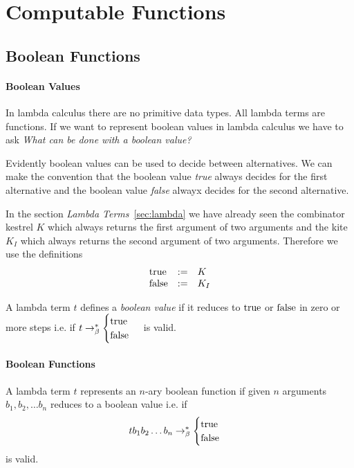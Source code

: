 \section{Computable Functions}


\subsection {Boolean Functions}

\paragraph{Boolean Values}

In lambda calculus there are no primitive data types. All lambda terms are
functions. If we want to represent boolean values in lambda calculus we have
to ask \emph{What can be done with a boolean value?}

Evidently boolean values can be used to decide between alternatives. We can
make the convention that the boolean value \emph{true} always decides for the
first alternative and the boolean value \emph{false} alwayx decides for the
second alternative.

In the section \emph{Lambda Terms}~\ref{sec:lambda} we have already seen the
combinator kestrel $K$ which always returns the first argument of two
arguments and the kite $K_I$ which always returns the second argument of two
arguments. Therefore we use the definitions
$$
\begin{array}{lll}
  \text{true}  & := & K \\
  \text{false} & := & K_I
\end{array}$$


\begin{definition}
  A lambda term $t$ defines a \emph{boolean value} if it reduces to $\text{true}$ or
  $\text{false}$ in zero or more steps i.e. if
  $t \to^*_\beta
  \begin{cases} \text{true} \\ \text{false}
  \end{cases}$
  is valid.
\end{definition}



\paragraph{Boolean Functions}

\begin{definition}
  A lambda term $t$ represents an $n$-ary boolean function if given $n$
  arguments $b_1, b_2, \ldots b_n$ reduces to a boolean value i.e. if
  $$t b_1 b_2 \ldots b_n \to^*_\beta
  \begin{cases} \text{true} \\ \text{false}
  \end{cases}$$
  is valid.
\end{definition}



